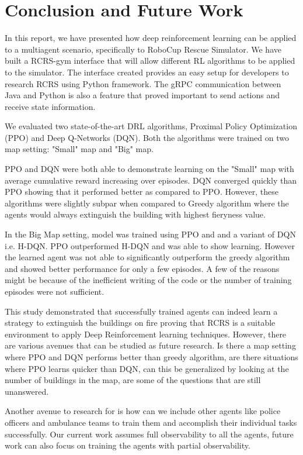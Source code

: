 \documentclass[12pt]{report}
\begin{document}
\chapter{Conclusion and Future Work}

In this report, we have presented how deep reinforcement learning can be applied to a multiagent scenario, specifically to RoboCup Rescue Simulator. We have built a RCRS-gym interface that will allow different RL algorithms to be applied to the simulator. The interface created provides an easy setup for developers to research RCRS using Python framework. The gRPC communication between Java and Python is also a feature that proved important to send actions and receive state information. 

We evaluated two state-of-the-art DRL algorithms, Proximal Policy Optimization (PPO) and Deep Q-Networks (DQN). Both the algorithms were trained on two map setting: "Small" map and "Big" map. 

PPO and DQN were both able to demonstrate learning on the "Small" map with average cumulative reward increasing over episodes. DQN converged quickly than PPO showing that it performed better as compared to PPO. However, these algorithms were slightly subpar when compared to Greedy algorithm where the agents would always extinguish the building with highest fieryness value. 

In the Big Map setting, model was trained using PPO and and a variant of DQN i.e. H-DQN. PPO outperformed H-DQN and was able to show learning. However the learned agent was not able to significantly outperform the greedy algorithm and showed better performance for only a few episodes. A few of the reasons might be because of the inefficient writing of the code or the number of training episodes were not sufficient. 

This study demonstrated that successfully trained agents can indeed learn a strategy to extinguish the buildings on fire proving that RCRS is a suitable environment to apply Deep Reinforcement learning techniques. However, there are various avenues that can be studied as future research. Is there a map setting where PPO and DQN performs better than greedy algorithm, are there situations where PPO learns quicker than DQN, can this be generalized by looking at the number of buildings in the map, are some of the questions that are still unanswered. 

Another avenue to research for is how can we include other agents like police officers and ambulance teams to train them and accomplish their individual tasks successfully. Our current work assumes full observability to all the agents, future work can also focus on training the agents with partial observability. 




      
\end{document}
